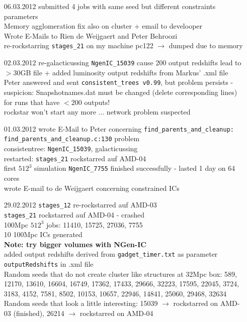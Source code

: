 \documentclass[a4paper,11pt,fleqn,oneside]{book}
\begin{document}
\begin{itemize}
\item[06.03.2012]
submitted 4 jobs with same seed but different constraints 
parameters \\
Memory agglomeration fix also on cluster + email to develooper \\
Wrote E-Mails to Rien de Weijgaert and Peter Behroozi \\
re-rockstarring \texttt{stages\_21} on my machine pc122  $\rightarrow$ 
dumped due to memory  \\

\item[02.03.2012]
re-galacticussing \texttt{NgenIC\_15039} cause 200 output redshifts 
lead to $>30$GB file + added luminosity output redshifts from 
Markus' .xml file \\
Peter answered and sent \texttt{consistent\_trees v0.99}, but problem 
persists - suspicion: Snapshotnames.dat must be changed (delete 
corresponding lines) for runs that have $<200$ outputs! \\
rockstar won't start any more ... network problem suspected \\


\item[01.03.2012]
wrote E-Mail to Peter concerning 
\texttt{find\_parents\_and\_cleanup: \\ find\_parents\_and\_cleanup.c:130}
problem \\
consistentree: \texttt{NgenIC\_15039}, galacticussing \\
restarted: \texttt{stages\_21} rockstarred auf AMD-04 \\
first $512^3$ simulation \texttt{NgenIC\_7755} finished successfully - lasted 
1 day on 64 cores \\
wrote E-mail to de Weijgaert concerning constrained ICs \\

\item[29.02.2012]
\texttt{stages\_12} re-rockstarred auf AMD-03 \\
\texttt{stages\_21} rockstarred auf AMD-04 - crashed \\
100Mpc $512^3$ jobs: 11410, 15725, 27036, 7755 \\
10 100Mpc ICs generated \\
\textbf{Note: try bigger volumes with NGen-IC} \\ 
added output redshifts derived from \texttt{gadget\_timer.txt} as 
parameter \texttt{outputRedshifts} in .xml file \\ 
Random seeds that do not create cluster like structures at 
32Mpc box: 589, 12170, 13610, 16604, 16749, 17362, 17433, 29666, 32223, 
17595, 22045, 3724, 3183, 4152, 7581, 8502, 10153, 10657, 22946, 14841, 
25060, 29468, 32634
\\
Random seeds that look a little interesting: 15039 $\rightarrow$ rockstarred 
on AMD-03 (finished), 26214 $\rightarrow$ rockstarred on AMD-04



\end{itemize}
\end{document}
